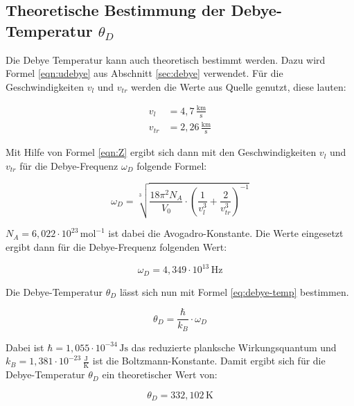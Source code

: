 \subsection[Theoretische Bestimmung der Debye-Temperatur]{Theoretische Bestimmung der Debye-Temperatur $\theta_D$}
\label{sec:theo_debye_temp}

Die Debye Temperatur kann auch theoretisch bestimmt werden. Dazu wird Formel \eqref{eqn:udebye} aus Abschnitt \ref{sec:debye} verwendet. Für die Geschwindigkeiten $v_l$ und $v_{tr}$ werden die Werte aus Quelle \cite{Anleitung} genutzt, diese lauten:

\begin{align*}
    v_l &=  4, \! 7 \, \frac{\mathrm{km}}{\mathrm{s}} \\
    v_{tr} &= 2, \! 26 \, \frac{\mathrm{km}}{\mathrm{s}}
\end{align*}

Mit Hilfe von Formel \eqref{eqn:Z} ergibt sich dann mit den Geschwindigkeiten $v_l$ und $v_{tr}$ für die Debye-Frequenz $\omega_D$ folgende Formel:

\begin{equation}
    \omega_D = \sqrt[3]{\frac{18 \pi^2 N_A}{V_0} \cdot \left( \frac{1}{v_l^3} + \frac{2}{v_{tr}^3} \right)^{-1} }
    \label{eq:omega}
\end{equation}

$N_A = 6, \! 022 \cdot 10^ {23} \, \mathrm{mol}^{-1}$ ist dabei die Avogadro-Konstante. Die Werte eingesetzt ergibt dann für die Debye-Frequenz folgenden Wert:

\begin{equation*}
    \omega_D = 4, \! 349 \cdot 10^{13} \, \mathrm{Hz}
\end{equation*}

Die Debye-Temperatur $\theta_D$ lässt sich nun mit Formel \eqref{eq:debye-temp} bestimmen.

\begin{equation}
    \theta_D = \frac{\hbar}{k_B} \cdot \omega_D
    \label{eq:debye-temp}
\end{equation}

Dabei ist $\hbar = 1, \! 055 \cdot 10^{-34} \, \mathrm{Js}$ \cite{h_quer} das reduzierte planksche Wirkungsquantum und $k_B = 1, \! 381 \cdot 10^{-23} \, \frac{\mathrm{J}}{\mathrm{K}}$ \cite{k_B} ist die Boltzmann-Konstante. Damit ergibt sich für die Debye-Temperatur $\theta_D$ ein theoretischer Wert von:

\begin{equation*}
    \theta_D = 332, \! 102 \, \mathrm{K}
\end{equation*}
